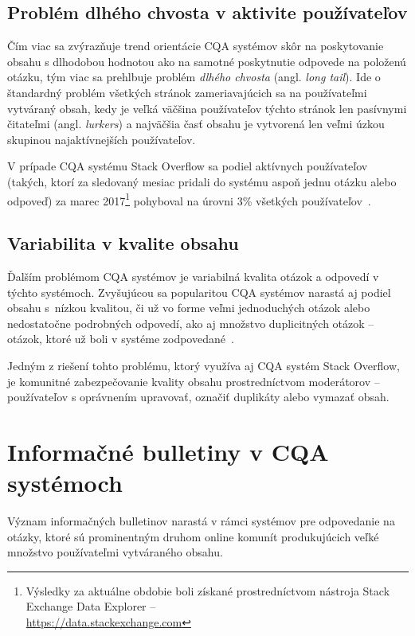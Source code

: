 \subsection{Problém dlhého chvosta v aktivite používateľov}\label{cqa:tail}
Čím viac sa zvýrazňuje trend orientácie CQA systémov skôr na poskytovanie obsahu s dlhodobou hodnotou ako na samotné
poskytnutie odpovede na položenú otázku, tým viac sa prehlbuje problém \emph{dlhého chvosta} (angl. \emph{long tail}).
Ide o štandardný problém všetkých stránok zameriavajúcich sa na používateľmi vytváraný obsah, kedy je veľká väčšina
používateľov týchto stránok len pasívnymi čitateľmi (angl. \emph{lurkers}) a najväčšia časť obsahu je vytvorená len veľmi
úzkou skupinou najaktívnejších používateľov.

V prípade CQA systému Stack Overflow sa podiel aktívnych používateľov (takých, ktorí za sledovaný mesiac pridali
do systému aspoň jednu otázku alebo odpoveď) za marec 2017\footnote{Výsledky za aktuálne obdobie boli získané prostredníctvom nástroja Stack
Exchange Data Explorer -- \\\url{https://data.stackexchange.com}} pohyboval na úrovni 3\% všetkých
používateľov~\cite{Srba2016SOFail}.

\subsection{Variabilita v kvalite obsahu}
Ďalším problémom CQA systémov je variabilná kvalita otázok a odpovedí v týchto systémoch. Zvyšujúcou sa popularitou CQA
systémov narastá aj podiel obsahu s~nízkou kvalitou, či už vo forme veľmi jednoduchých otázok alebo nedostatočne
podrobných odpovedí, ako aj množstvo duplicitných otázok -- otázok, ktoré už boli v systéme
zodpovedané~\cite{Srba2016SOFail,Ponzanelli2014}.

Jedným z riešení tohto problému, ktorý využíva aj CQA systém Stack Overflow, je komunitné zabezpečovanie kvality obsahu
prostredníctvom moderátorov -- používateľov s oprávnením upravovať, označiť duplikáty alebo vymazať obsah.


\section{Informačné bulletiny v CQA systémoch}

Význam informačných bulletinov narastá v rámci systémov pre odpovedanie na otázky, ktoré sú prominentným druhom
online komunít produkujúcich veľké množstvo používateľmi vytváraného obsahu.

